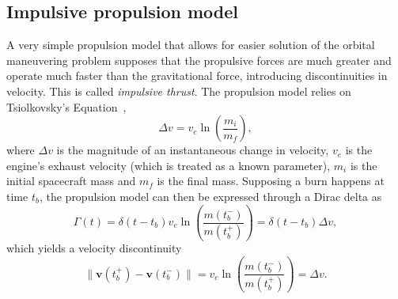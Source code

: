 

\subsection{Impulsive propulsion model}\label{sec:imp_prop_model}


A very simple propulsion model that allows for easier solution of the orbital maneuvering problem supposes that the propulsive forces are much greater and operate much faster than the gravitational force, introducing discontinuities in velocity. This is called \textit{impulsive thrust}. The propulsion model relies on Tsiolkovsky's Equation~\cite{Conway_2010}, 
\begin{equation}
    \Delta v = v_e \ln{\left(\frac{m_i}{m_f}\right)},
\end{equation}
where \(\Delta v\) is the magnitude of an instantaneous change in velocity, \(v_e\) is the engine's exhaust velocity (which is treated as a known parameter), \(m_i\) is the initial spacecraft mass and \(m_f\) is the final mass. Supposing a burn happens at time \(t_b\), the propulsion model can then be expressed through a Dirac delta as
\begin{equation}
    \Gamma(t) = \delta(t - t_b) v_e \ln{\left(\frac{m(t_b^-)}{m(t_b^+)} \right)} = \delta(t - t_b) \Delta v,
\end{equation}
which yields a velocity discontinuity
\begin{equation}
    \lVert \mathbf{v}(t_b^+) - \mathbf{v}(t_b^-) \rVert = v_e \ln{\left(\frac{m(t_b^-)}{m(t_b^+)}\right)} = \Delta v.
\end{equation}


